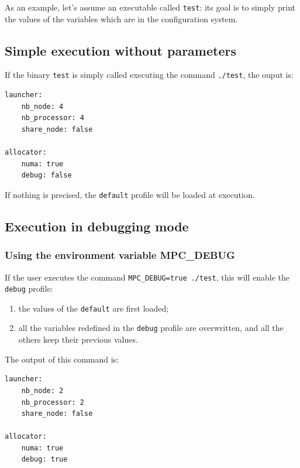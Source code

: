 \documentclass{article}
\begin{document}
\noindent As an example, let's assume an executable called \texttt{test}: its goal is to simply print the values of the variables which are in the configuration system.

\subsection{Simple execution without parameters}

If the binary \texttt{test} is simply called executing the command \texttt{./test}, the ouput is:

\lstset{language=bash}
\begin{lstlisting}[title=Output of a simple execution]
launcher:
    nb_node: 4
    nb_processor: 4
    share_node: false

allocator:
    numa: true
    debug: false
\end{lstlisting}

\noindent If nothing is precised, the \texttt{default} profile will be loaded at execution.

\subsection{Execution in debugging mode}

\subsubsection{Using the environment variable MPC\_DEBUG}
\label{conf_debug_mode}

If the user executes the command \texttt{MPC\_DEBUG=true ./test}, this will enable the \texttt{debug} profile:
\begin{enumerate}
\item the values of the \texttt{default} are first loaded;
\item all the variables redefined in the \texttt{debug} profile are overwritten, and all the others keep their previous values.
\end{enumerate}

\noindent The output of this command is:

\lstset{language=bash}
\begin{lstlisting}[title=Output when enabling the debug mode]
launcher:
    nb_node: 2
    nb_processor: 2
    share_node: false

allocator:
    numa: true
    debug: true
\end{lstlisting}
\end{document}
